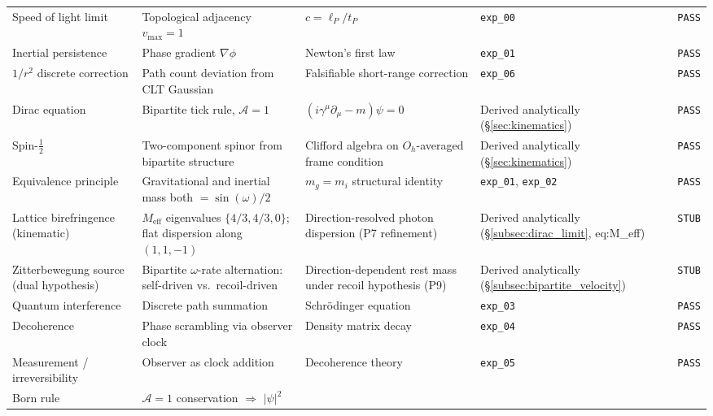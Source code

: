 {\begin{longtable}{@{}p{2.6cm}p{3.8cm}p{3.2cm}p{4.4cm}p{1.0cm}@{}}
\hline
\endlastfoot
Speed of light limit
    & Topological adjacency $v_\text{max}=1$
    & $c = \ell_P / t_P$
    & \texttt{exp\_00}
    & \texttt{PASS} \\
Inertial persistence
    & Phase gradient $\nabla\phi$
    & Newton's first law
    & \texttt{exp\_01}
    & \texttt{PASS} \\
$1/r^2$ discrete correction
    & Path count deviation from CLT Gaussian
    & Falsifiable short-range correction
    & \texttt{exp\_06}
    & \texttt{PASS} \\
Dirac equation
    & Bipartite tick rule, $\mathcal{A}=1$
    & $(i\gamma^\mu\partial_\mu - m)\psi = 0$
    & Derived analytically (§\ref{sec:kinematics})
    & \texttt{PASS} \\
Spin-$\tfrac{1}{2}$
    & Two-component spinor from bipartite structure
    & Clifford algebra on $O_h$-averaged frame condition
    & Derived analytically (§\ref{sec:kinematics})
    & \texttt{PASS} \\
Equivalence principle
    & Gravitational and inertial mass both $= \sin(\omega)/2$
    & $m_g = m_i$ structural identity
    & \texttt{exp\_01}, \texttt{exp\_02}
    & \texttt{PASS} \\
Lattice birefringence (kinematic)
    & $M_\text{eff}$ eigenvalues $\{4/3, 4/3, 0\}$;
      flat dispersion along $(1,1,-1)$
    & Direction-resolved photon dispersion (P7 refinement)
    & Derived analytically (§\ref{subsec:dirac_limit}, eq:M\_eff)
    & \texttt{STUB} \\
Zitterbewegung source (dual hypothesis)
    & Bipartite $\omega$-rate alternation: self-driven vs.\ recoil-driven
    & Direction-dependent rest mass under recoil hypothesis (P9)
    & Derived analytically (§\ref{subsec:bipartite_velocity})
    & \texttt{STUB} \\
\hline
Quantum interference
    & Discrete path summation
    & Schr\"{o}dinger equation
    & \texttt{exp\_03}
    & \texttt{PASS} \\
Decoherence
    & Phase scrambling via observer clock
    & Density matrix decay
    & \texttt{exp\_04}
    & \texttt{PASS} \\
Measurement / irreversibility
    & Observer as clock addition
    & Decoherence theory
    & \texttt{exp\_05}
    & \texttt{PASS} \\
Born rule
    & $\mathcal{A}=1$ conservation $\Rightarrow$ $|\psi|^2$

\end{longtable}}
